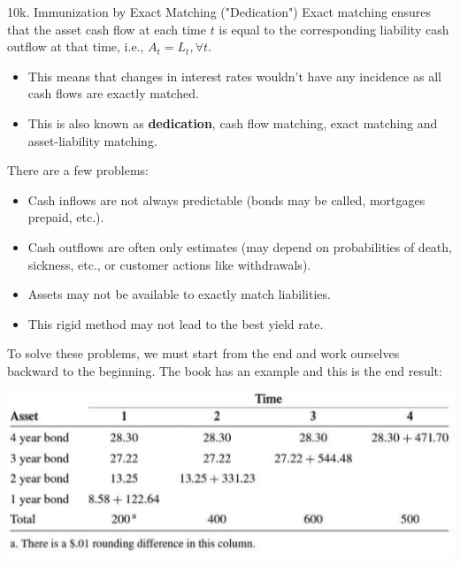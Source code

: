 \begin{CHPT_SUMM_AUTO}[label = {L.-10k}]{10k. Immunization by Exact Matching ("Dedication")}
Exact matching ensures that the asset cash flow at each time $t$ is equal to the corresponding liability cash outflow at that time, i.e., $A_{t} = L_{t}, \forall t$.

\begin{itemize}[leftmargin = *]
	\item	This means that changes in interest rates wouldn't have any incidence as all cash flows are exactly matched.
	\item	This is also known as \textbf{dedication}, cash flow matching, exact matching and asset-liability matching.
\end{itemize}

There are a few problems:

\begin{itemize}[leftmargin = *]
	\item	Cash inflows are not always predictable (bonds may be called, mortgages prepaid, etc.).
	\item	Cash outflows are often only estimates (may depend on probabilities of death, sickness, etc., or customer actions like withdrawals).
	\item	Assets may not be available to exactly match liabilities.
	\item	This rigid method may not lead to the best yield rate.
\end{itemize}

To solve these problems, we must start from the end and work ourselves backward to the beginning. The book has an example and this is the end result:
\begin{center}
	\includegraphics[scale=0.4]{img/immunization-exact.png}
\end{center}
\end{CHPT_SUMM_AUTO}